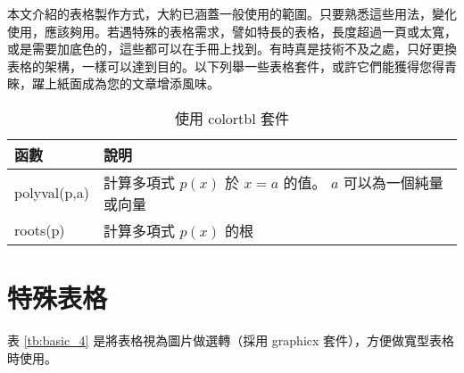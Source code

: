 本文介紹的表格製作方式，大約已涵蓋一般使用的範圍。只要熟悉這些用法，變化使用，應該夠用。若遇特殊的表格需求，譬如特長的表格，長度超過一頁或太寬，或是需要加底色的，這些都可以在手冊上找到。有時真是技術不及之處，只好更換表格的架構，一樣可以達到目的。以下列舉一些表格套件，或許它們能獲得您得青睞，躍上紙面成為您的文章增添風味。

\begin{table}[h]
\begin{center}
\caption{使用 {\A colortbl} 套件}\label{tb:b}
\extrarowheight=4pt
\begin{tabular}{ll}
\rowcolor[gray]{.9}
函數			&	說明\\
\toprule
polyval(p,a)	&	計算多項式 $p(x)$ 於 $x=a$ 的值。 $a$ 可以為一個純量或向量\\
roots(p)		&	計算多項式 $p(x)$ 的根\\
\bottomrule
\end{tabular}
\end{center}
\vspace{1cm}
\end{table}


\section{特殊表格}
表 \ref{tb:basic_4} 是將表格視為圖片做選轉（採用  {\A graphicx} 套件），方便做寬型表格時使用。
\begin{table}[h]
\begin{center}
\caption{旋轉表格}\label{tb:basic_4}
\extrarowheight=6pt
\hspace{10pt}
\extrarowheight=6pt
\end{center}
\end{table}


